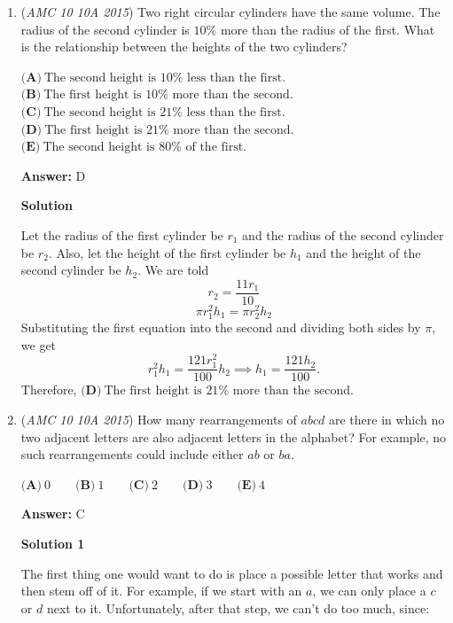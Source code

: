 \begin{enumerate}
 $20+x=2(8+x)$
$20+x=16+2x$
$x=4$

 The answer is $\boxed{\textbf{(B) }4}$.

 


 


 


	\item (\textit{AMC 10 10A 2015}) Two right circular cylinders have the same volume. The radius of the second cylinder is $10\%$ more than the radius of the first. What is the relationship between the heights of the two cylinders?


 $\textbf{(A)}\  \text{The second height is } 10\% \text{ less than the first.}$
$\textbf{(B)}\  \text{The first height is } 10\% \text{ more than the second.}$
$\textbf{(C)}\ \text{The second height is } 21\% \text{ less than the first.}$
$\textbf{(D)}\ \text{The first height is } 21\% \text{ more than the second.}$
$\textbf{(E)}\ \text{The second height is } 80\% \text{ of the first.}$

 \textbf{Answer: }D



\textbf{Solution}

Let the radius of the first cylinder be $r_1$ and the radius of the second cylinder be $r_2$. Also, let the height of the first cylinder be $h_1$ and the height of the second cylinder be $h_2$. We are told 
 \[r_2=\frac{11r_1}{10}\] 
 \[\pi r_1^2h_1=\pi r_2^2h_2\] Substituting the first equation into the second and dividing both sides by $\pi$, we get 
 \[r_1^2h_1=\frac{121r_1^2}{100}h_2\implies h_1=\frac{121h_2}{100}.\] Therefore, $\boxed{\textbf{(D)}\ \text{The first height is } 21\% \text{ more than the second.}}$



	\item (\textit{AMC 10 10A 2015}) How many rearrangements of $abcd$ are there in which no two adjacent letters are also adjacent letters in the alphabet?  For example, no such rearrangements could include either $ab$ or $ba$.


 $\textbf{(A)}\ 0\qquad\textbf{(B)}\ 1\qquad\textbf{(C)}\ 2\qquad\textbf{(D)}\ 3\qquad\textbf{(E)}\ 4$

 \textbf{Answer: }C



\textbf{Solution 1}

The first thing one would want to do is place a possible letter that works and then stem off of it.  For example, if we start with an $a$, we can only place a $c$ or $d$ next to it.  Unfortunately, after that step, we can't do too much, since:


\end{enumerate}
